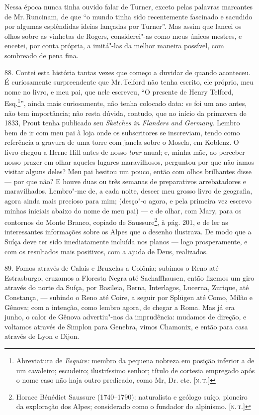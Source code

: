 Nessa época nunca tinha ouvido falar de Turner, exceto pelas palavras
marcantes de Mr.\,Runcinam, de que ``o mundo tinha sido recentemente
fascinado e sacudido por algumas esplêndidas ideias lançadas por
Turner''. Mas assim que lancei os olhos sobre as vinhetas de Rogers,
considerei"-as como meus únicos mestres, e encetei, por conta própria, a
imitá"-las da melhor maneira possível, com sombreado de pena fina.

88. Contei esta história tantas vezes que começo a duvidar de quando
aconteceu. É curiosamente surpreendente que Mr.\,Telford não tenha
escrito, ele próprio, meu nome no livro, e meu pai, que nele escreveu,
``O presente de Henry Telford, Esq.\footnote{Abreviatura de
  \emph{Esquire:} membro da pequena nobreza em posição inferior a de um
  cavaleiro; escudeiro; ilustríssimo senhor; título de cortesia
  empregado após o nome caso não haja outro predicado, como Mr, Dr. etc.
  {[}\textsc{n.\,t.}{]}}'', ainda mais curiosamente, não tenha colocado data:
se foi um ano antes, não tem importância; não resta dúvida, contudo, que
no início da primavera de 1833, Prout tenha publicado seu \emph{Sketches
in Flanders and Germany}. Lembro bem de ir com meu pai à loja onde os
subscritores se inscreviam, tendo como referência a gravura de uma torre
com janela sobre o Mosela, em Koblenz. O livro chegou a Herne Hill antes
de nosso \emph{tour} anual; e, minha mãe, ao perceber nosso prazer em
olhar aqueles lugares maravilhosos, perguntou por que não íamos visitar
alguns deles? Meu pai hesitou um pouco, então com olhos brilhantes disse
--- por que não? E houve duas ou três semanas de preparativos
arrebatadores e maravilhados. Lembro"-me de, a cada noite, descer meu
grosso livro de geografia, agora ainda mais precioso para mim; (desço"-o
agora, e pela primeira vez escrevo minhas iniciais abaixo do nome de meu
pai) --- e de olhar, com Mary, para os contornos do Monte Branco, copiado
de Saussure\footnote{Horace Bénédict Saussure (1740--1790): naturalista e
  geólogo suíço, pioneiro da exploração dos Alpes; considerado como o
  fundador do alpinismo. {[}\textsc{n.\,t.}{]}}, à pág. 201, e de ler as
interessantes informações sobre os Alpes que o desenho ilustrava. De
modo que a Suíça deve ter sido imediatamente incluída nos planos --- logo
prosperamente, e com os resultados mais positivos, com a ajuda de Deus,
realizados.

89. Fomos através de Calais e Bruxelas a Colônia; subimos o Reno até
Estrasburgo, cruzamos a Floresta Negra até Sachaffhausen, então fizemos
um giro através do norte da Suíça, por Basileia, Berna, Interlagos,
Lucerna, Zurique, até Constança, --- subindo o Reno até Coire, a seguir
por Splügen até Como, Milão e Gênova; com a intenção, como lembro agora,
de chegar a Roma. Mas já era junho, o calor de Gênova advertiu"-nos da
imprudência: mudamos de direção, e voltamos através de Simplon para
Genebra, vimos Chamonix, e então para casa através de Lyon e Dijon.

